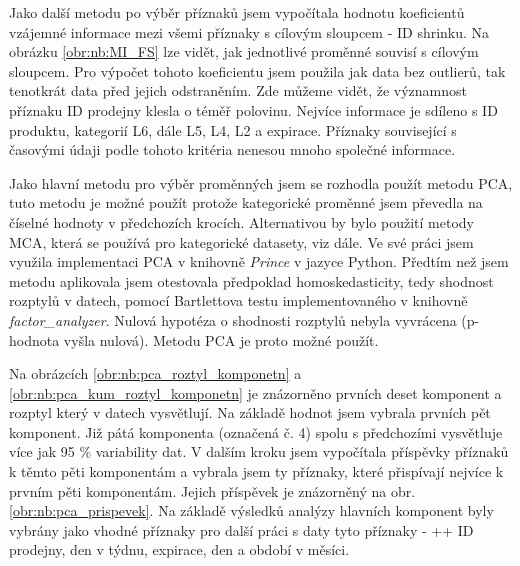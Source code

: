 Jako další metodu po výběr příznaků jsem vypočítala hodnotu koeficientů vzájemné informace mezi všemi příznaky s cílovým sloupcem - ID shrinku. Na obrázku \ref*{obr:nb:MI_FS} lze vidět, jak jednotlivé proměnné souvisí s cílovým sloupcem. Pro výpočet tohoto koeficientu jsem použila jak data bez outlierů, tak tenotkrát data před jejich odstraněním. Zde můžeme vidět, že významnost příznaku ID prodejny klesla o téměř polovinu. Nejvíce informace je sdíleno s ID produktu, kategorií L6, dále L5, L4, L2 a expirace. Příznaky související s časovými údaji podle tohoto kritéria nenesou mnoho společné informace.

Jako hlavní metodu pro výběr proměnných jsem se rozhodla použít metodu PCA, tuto metodu je možné použít protože kategorické proměnné jsem převedla na číselné hodnoty v předchozích krocích. Alternativou by bylo použití metody MCA, která se používá pro kategorické datasety, viz dále.
Ve své práci jsem využila implementaci PCA v knihovně \emph{Prince} v jazyce Python. 
Předtím než jsem metodu aplikovala jsem otestovala předpoklad homoskedasticity, tedy shodnost rozptylů v datech, pomocí Bartlettova testu implementovaného v knihovně \emph{factor\_analyzer}. Nulová hypotéza o shodnosti rozptylů nebyla vyvrácena (p-hodnota vyšla nulová). Metodu PCA je proto možné použít.

Na obrázcích \ref*{obr:nb:pca_roztyl_komponetn} a \ref*{obr:nb:pca_kum_roztyl_komponetn} je znázorněno prvních deset komponent a rozptyl který v datech vysvětlují. Na základě hodnot jsem vybrala prvních pět komponent. Již pátá komponenta (označená č. 4) spolu s předchozími vysvětluje více jak 95 \% variability dat. V dalším kroku jsem vypočítala příspěvky příznaků k těmto pěti komponentám a vybrala jsem ty příznaky, které přispívají nejvíce k prvním pěti komponentám. Jejich příspěvek je znázorněný na obr. \ref*{obr:nb:pca_prispevek}. Na základě výsledků analýzy hlavních komponent byly vybrány jako vhodné příznaky pro další práci s daty tyto příznaky - ++ ID prodejny, den v týdnu, expirace, den a období v měsíci.

